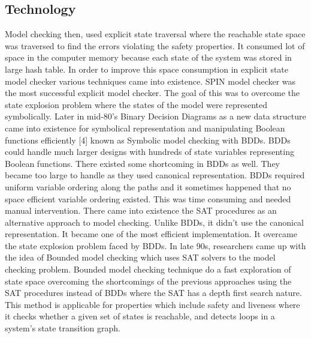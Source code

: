 \documentclass[a4paper,12pt]{extarticle}
\begin{document}
\subsection{Technology}
\label{tech}
Model checking then, used explicit state traversal where the reachable state space was traversed to find the errors violating the safety properties. It consumed lot of space in the computer memory because each state of the system was stored in large hash table. In order to improve this space consumption in explicit state model checker various techniques came into existence. SPIN model checker was the most successful explicit model checker. The goal of this was to overcome the state explosion problem where the states of the model were represented symbolically. 
Later in mid-80's Binary Decision Diagrams as a new data structure came into existence for symbolical representation and manipulating Boolean functions efficiently [4] known as Symbolic model checking with BDDs. BDDs could handle much larger designs with hundreds of state variables representing Boolean functions. There existed some shortcoming in BDDs as well. They became too large to handle as they used canonical representation. BDDs required uniform variable ordering along the paths and it sometimes happened that no space efficient variable ordering existed. This was time consuming and needed manual intervention. 
There came into existence the SAT procedures as an alternative approach to model checking. Unlike BDDs, it didn’t use the canonical representation. It became one of the most efficient implementation. It overcame the state explosion problem faced by BDDs. 
In late 90s, researchers came up with the idea of Bounded model checking which uses SAT solvers to the model checking problem. Bounded model checking technique do a fast exploration of state space overcoming the shortcomings of the previous approaches using the SAT procedures instead of BDDs where the SAT has a depth first search nature. This method is applicable for properties which include safety and liveness where it checks whether a given set of states is reachable, and detects loops in a system’s state transition graph.
\end{document}
